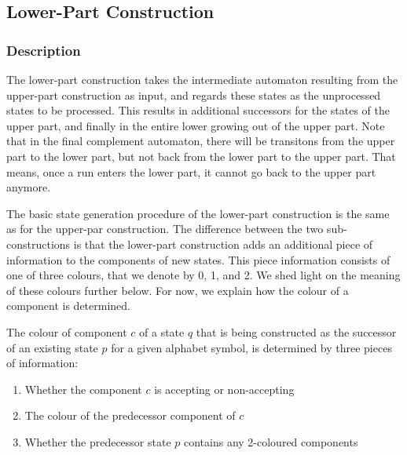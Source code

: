 


\subsection{Lower-Part Construction}
\label{3_lower_part}

\subsubsection{Description}
The lower-part construction takes the intermediate automaton resulting from the upper-part construction as input, and regards these states as the unprocessed states to be processed. This results in additional successors for the states of the upper part, and finally in the entire lower growing out of the upper part. Note that in the final complement automaton, there will be transitons from the upper part to the lower part, but not back from the lower part to the upper part. That means, once a run enters the lower part, it cannot go back to the upper part anymore.

The basic state generation procedure of the lower-part construction is the same as for the upper-par construction. The difference between the two sub-constructions is that the lower-part construction adds an additional piece of information to the components of new states. This piece information consists of one of three colours, that we denote by 0, 1, and 2. We shed light on the meaning of these colours further below. For now, we explain how the colour of a component is determined.

The colour of component $c$ of a state $q$ that is being constructed as the successor of an existing state $p$ for a given alphabet symbol, is determined by three pieces of information:

\begin{enumerate}
\item Whether the component $c$ is accepting or non-accepting
\item The colour of the predecessor component of $c$ 
\item Whether the predecessor state $p$ contains any 2-coloured components
\end{enumerate}

